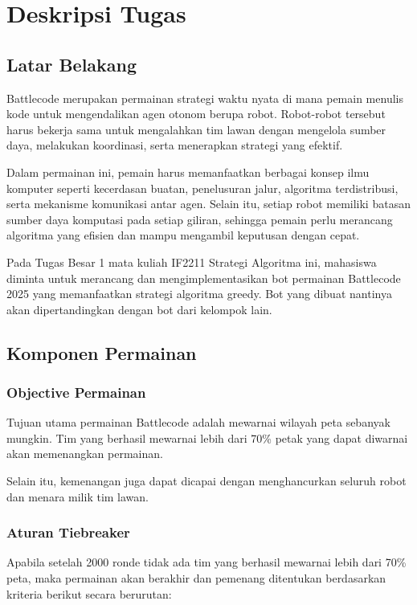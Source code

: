 \section{Deskripsi Tugas}
\subsection{Latar Belakang}
Battlecode merupakan permainan strategi waktu nyata di mana pemain menulis kode untuk mengendalikan agen otonom berupa robot. Robot-robot tersebut harus bekerja sama untuk mengalahkan tim lawan dengan mengelola sumber daya, melakukan koordinasi, serta menerapkan strategi yang efektif.

Dalam permainan ini, pemain harus memanfaatkan berbagai konsep ilmu komputer seperti kecerdasan buatan, penelusuran jalur, algoritma terdistribusi, serta mekanisme komunikasi antar agen. Selain itu, setiap robot memiliki batasan sumber daya komputasi pada setiap giliran, sehingga pemain perlu merancang algoritma yang efisien dan mampu mengambil keputusan dengan cepat.

Pada Tugas Besar 1 mata kuliah IF2211 Strategi Algoritma ini, mahasiswa diminta untuk merancang dan mengimplementasikan bot permainan Battlecode 2025 yang memanfaatkan strategi algoritma greedy. Bot yang dibuat nantinya akan dipertandingkan dengan bot dari kelompok lain.

\subsection{Komponen Permainan}

\subsubsection{Objective Permainan}

Tujuan utama permainan Battlecode adalah mewarnai wilayah peta sebanyak mungkin. Tim yang berhasil mewarnai lebih dari 70\% petak yang dapat diwarnai akan memenangkan permainan.

Selain itu, kemenangan juga dapat dicapai dengan menghancurkan seluruh robot dan menara milik tim lawan.

\subsubsection{Aturan Tiebreaker}

Apabila setelah 2000 ronde tidak ada tim yang berhasil mewarnai lebih dari 70\% peta, maka permainan akan berakhir dan pemenang ditentukan berdasarkan kriteria berikut secara berurutan:


